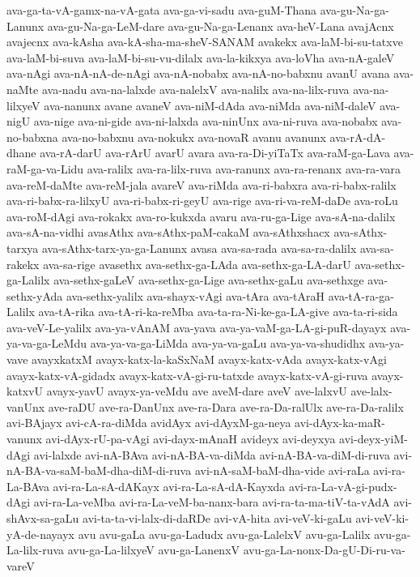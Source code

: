 {ava-ga-ta-vA-gamx-na-vA-gata
ava-ga-vi-sadu
ava-guM-Thana
ava-gu-Na-ga-Lanunx
ava-gu-Na-ga-LeM-dare
ava-gu-Na-ga-Lenanx
ava-heV-Lana
avajAcnx
avajecnx
ava-kAsha
ava-kA-sha-ma-sheV-SANAM
avakekx
ava-laM-bi-su-tatxve
ava-laM-bi-suva
ava-laM-bi-su-vu-dilalx
ava-la-kikxya
ava-loVha
ava-nA-galeV
ava-nAgi
ava-nA-nA-de-nAgi
ava-nA-nobabx
ava-nA-no-babxnu
avanU
avana
ava-naMte
ava-nadu
ava-na-lalxde
ava-nalelxV
ava-nalilx
ava-na-lilx-ruva
ava-na-lilxyeV
ava-nanunx
avane
avaneV
ava-niM-dAda
ava-niMda
ava-niM-daleV
ava-nigU
ava-nige
ava-ni-gide
ava-ni-lalxda
ava-ninUnx
ava-ni-ruva
ava-nobabx
ava-no-babxna
ava-no-babxnu
ava-nokukx
ava-novaR
avanu
avanunx
ava-rA-dA-dhane
ava-rA-darU
ava-rArU
avarU
avara
ava-ra-Di-yiTaTx
ava-raM-ga-Lava
ava-raM-ga-va-Lidu
ava-ralilx
ava-ra-lilx-ruva
ava-ranunx
ava-ra-renanx
ava-ra-vara
ava-reM-daMte
ava-reM-jala
avareV
ava-riMda
ava-ri-babxra
ava-ri-babx-ralilx
ava-ri-babx-ra-lilxyU
ava-ri-babx-ri-geyU
ava-rige
ava-ri-va-reM-daDe
ava-roLu
ava-roM-dAgi
ava-rokakx
ava-ro-kukxda
avaru
ava-ru-ga-Lige
ava-sA-na-dalilx
ava-sA-na-vidhi
avasAthx
ava-sAthx-paM-cakaM
ava-sAthxshacx
ava-sAthx-tarxya
ava-sAthx-tarx-ya-ga-Lanunx
avasa
ava-sa-rada
ava-sa-ra-dalilx
ava-sa-rakekx
ava-sa-rige
avasethx
ava-sethx-ga-LAda
ava-sethx-ga-LA-darU
ava-sethx-ga-Lalilx
ava-sethx-gaLeV
ava-sethx-ga-Lige
ava-sethx-gaLu
ava-sethxge
ava-sethx-yAda
ava-sethx-yalilx
ava-shayx-vAgi
ava-tAra
ava-tAraH
ava-tA-ra-ga-Lalilx
ava-tA-rika
ava-tA-ri-ka-reMba
ava-ta-ra-Ni-ke-ga-LA-give
ava-ta-ri-sida
ava-veV-Le-yalilx
ava-ya-vAnAM
ava-yava
ava-ya-vaM-ga-LA-gi-puR-dayayx
ava-ya-va-ga-LeMdu
ava-ya-va-ga-LiMda
ava-ya-va-gaLu
ava-ya-va-shudidhx
ava-ya-vave
avayxkatxM
avayx-katx-la-kaSxNaM
avayx-katx-vAda
avayx-katx-vAgi
avayx-katx-vA-gidadx
avayx-katx-vA-gi-ru-tatxde
avayx-katx-vA-gi-ruva
avayx-katxvU
avayx-yavU
avayx-ya-veMdu
ave
aveM-dare
aveV
ave-lalxvU
ave-lalx-vanUnx
ave-raDU
ave-ra-DanUnx
ave-ra-Dara
ave-ra-Da-ralUlx
ave-ra-Da-ralilx
avi-BAjayx
avi-cA-ra-diMda
avidAyx
avi-dAyxM-ga-neya
avi-dAyx-ka-maR-vanunx
avi-dAyx-rU-pa-vAgi
avi-dayx-mAnaH
avideyx
avi-deyxya
avi-deyx-yiM-dAgi
avi-lalxde
avi-nA-BAva
avi-nA-BA-va-diMda
avi-nA-BA-va-diM-di-ruva
avi-nA-BA-va-saM-baM-dha-diM-di-ruva
avi-nA-saM-baM-dha-vide
avi-raLa
avi-ra-La-BAva
avi-ra-La-sA-dAKayx
avi-ra-La-sA-dA-Kayxda
avi-ra-La-vA-gi-pudx-dAgi
avi-ra-La-veMba
avi-ra-La-veM-ba-nanx-bara
avi-ra-ta-ma-tiV-ta-vAdA
avi-shAvx-sa-gaLu
avi-ta-ta-vi-lalx-di-daRDe
avi-vA-hita
avi-veV-ki-gaLu
avi-veV-ki-yA-de-nayayx
avu
avu-gaLa
avu-ga-Ladudx
avu-ga-LalelxV
avu-ga-Lalilx
avu-ga-La-lilx-ruva
avu-ga-La-lilxyeV
avu-ga-LanenxV
avu-ga-La-nonx-Da-gU-Di-ru-va-vareV
}
